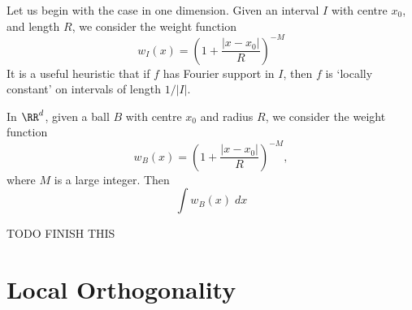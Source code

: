 Let us begin with the case in one dimension. Given an interval $I$ with centre $x_0$, and length $R$, we consider the weight function
%
\[ w_I(x) = \left( 1 + \frac{|x - x_0|}{R} \right)^{-M} \]
%
It is a useful heuristic that if $f$ has Fourier support in $I$, then $f$ is `locally constant' on intervals of length $1/|I|$.

In $\RR^d$, given a ball $B$ with centre $x_0$ and radius $R$, we consider the weight function
%
\[ w_B(x) = \left( 1 + \frac{|x - x_0|}{R} \right)^{-M}, \]
%
where $M$ is a large integer. Then
%
\[ \int w_B(x)\; dx \]

TODO FINISH THIS

\section{Local Orthogonality}

